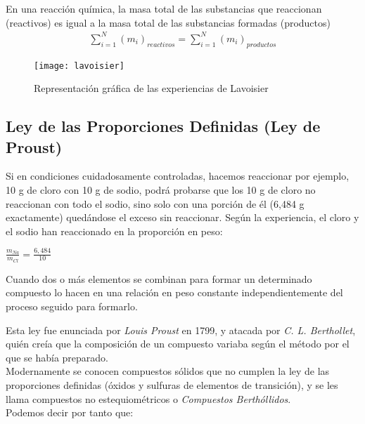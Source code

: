 \begin{law}
En una reacción química, la masa total de las substancias que reaccionan (reactivos) es igual a la masa total de las substancias formadas (productos)
\begin{align}
\sum_{i = 1}^{N}(m_i)_{reactivos} = \sum_{i = 1}^{N}(m_i)_{productos}
\end{align}
\end{law}
\begin{figure}[h!]
	\centering
	\texttt{[image: lavoisier]}
	\caption{Representación gráfica de las experiencias de Lavoisier}
\end{figure}

\subsection{Ley de las Proporciones Definidas (Ley de Proust)}

Si en condiciones cuidadosamente controladas, hacemos reaccionar por ejemplo, 10 g de cloro con 10 g de sodio, podrá probarse que los 10 g de cloro no reaccionan con todo el sodio, sino solo con una porción de él (6,484 g exactamente) quedándose el exceso sin reaccionar. Según la experiencia, el cloro y el sodio han reaccionado en la proporción en peso:\\

\begin{center}
	$\frac{m_{Na}}{m_{Cl}}=\frac{6,484}{10}$
\end{center}

\begin{law}
	Cuando dos o más elementos se combinan para formar un determinado compuesto lo hacen en una relación en peso constante independientemente del proceso seguido para formarlo.
\end{law}

Esta ley fue enunciada por \emph{Louis Proust} en 1799, y atacada por \emph{C. L. Berthollet}, quién creía que la composición de un compuesto variaba según el método por el que se había preparado.\\

Modernamente se conocen compuestos sólidos que no cumplen la ley de las proporciones definidas (óxidos y sulfuras de elementos de transición), y se les llama compuestos no estequiométricos o \emph{Compuestos Berthóllidos}.\\

Podemos decir por tanto que:

